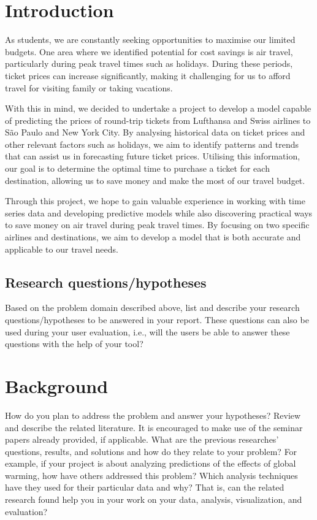 \section{Introduction}
\label{chap:introduction}

As students, we are constantly seeking opportunities to maximise our limited budgets. One area where we identified potential for cost savings is air travel, particularly during peak travel times such as holidays. During these periods, ticket prices can increase significantly, making it challenging for us to afford travel for visiting family or taking vacations.

With this in mind, we decided to undertake a project to develop a model capable of predicting the prices of round-trip tickets from Lufthansa and Swiss airlines to São Paulo and New York City. By analysing historical data on ticket prices and other relevant factors such as holidays, we aim to identify patterns and trends that can assist us in forecasting future ticket prices. Utilising this information, our goal is to determine the optimal time to purchase a ticket for each destination, allowing us to save money and make the most of our travel budget.

Through this project, we hope to gain valuable experience in working with time series data and developing predictive models while also discovering practical ways to save money on air travel during peak travel times. By focusing on two specific airlines and destinations, we aim to develop a model that is both accurate and applicable to our travel needs.

\subsection{Research questions/hypotheses}
\label{sec:quesstion}
Based on the problem domain described above, list and describe your research questions/hypotheses to be answered in your report. These questions can also be used during your user evaluation, i.e., will the users be able to answer these questions with the help of your tool? 

\section{Background}
\label{chap:background}
How do you plan to address the problem and answer your hypotheses? Review and describe the related literature. It is encouraged to make use of the seminar papers already provided, if applicable. What are the previous researches’ questions, results, and solutions and how do they relate to your problem? For example, if your project is about analyzing predictions of the effects of global warming, how have others addressed this problem? Which analysis techniques have they used for their particular data and why? That is, can the related research found help you in your work on your data, analysis, visualization, and evaluation?


